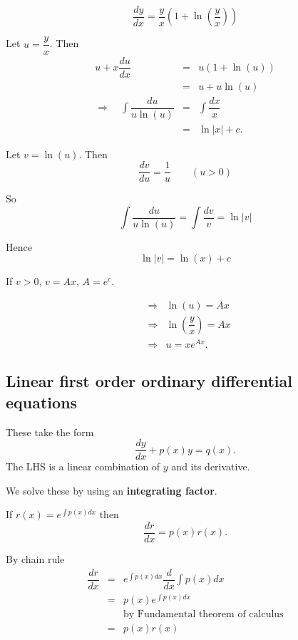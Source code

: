 \begin{example}
 \[
  \dfrac{dy}{dx} = \dfrac{y}{x} \left(1 + \ln \left(\dfrac{y}{x}\right)\right)
 \]
 
 Let $u=\dfrac{y}{x}$. Then
 \begin{eqnarray*}
  u + x \dfrac{du}{dx} &=& u (1 + \ln(u))\\
  &=& u + u \ln (u)\\
  \Rightarrow \quad \int \dfrac{du}{u \ln(u)} &=& \int \dfrac{dx}{x} \\
  &=& \ln \left|x\right| + c.
 \end{eqnarray*}

 Let $v=\ln(u)$. Then
 \[
  \dfrac{dv}{du} = \dfrac{1}{u} \qquad (u>0)
 \]

 So
 \[
  \int \dfrac{du}{u \ln(u)} = \int \dfrac{dv}{v} = \ln \left|v\right|
 \]
 
 Hence
 \[
  \ln \left|v\right| = \ln (x)+c
 \]
 
 If $v>0$, \quad $v=Ax$, \quad $A=e^{c}$.

\begin{eqnarray*}
& \Rightarrow & \ln (u) = Ax\\
& \Rightarrow & \ln \left(\dfrac{y}{x}\right) = Ax\\
& \Rightarrow & u=xe^{Ax}.
\end{eqnarray*}
\end{example}


\subsection{Linear first order ordinary differential equations}

These take the form
\begin{equation*}
\dfrac{dy}{dx} + p(x)y  =  q(x).
\label{lin_ODE}
\end{equation*}
The LHS is a linear combination of $y$ and its derivative.


We solve these by using an \textbf{integrating factor}. 


\begin{lemma}
If $r(x) = e^{\int p(x)dx}$ then
\[
\dfrac{dr}{dx}  =  p(x) r(x).
\]
\end{lemma}

\begin{Proof}
By chain rule
\begin{eqnarray*}
 \dfrac{dr}{dx}  &=&  e^{\int p(x)dx} \dfrac{d}{dx} \int
p(x)dx\\
&=& p(x) e^{\int p(x)dx} \\
&& \text{by Fundamental theorem of calculus}\\
&=& p(x) r(x)
\end{eqnarray*}
\end{Proof}

